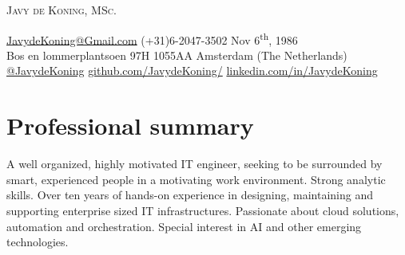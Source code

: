 \begin{center}

\fontsize{24}{24}\selectfont\scshape
Javy de Koning, MSc.\\

\fontsize{10}{10}\selectfont\scshape

{\color{companycolor}\faEnvelopeR} \url{JavydeKoning@Gmail.com}
{\large\textperiodcentered} 
{\color{companycolor}\faPhone} (+31)6-2047-3502
{\large\textperiodcentered}
{\color{companycolor}\faAlternateCalendarR} Nov 6\textsuperscript{th}, 1986\\

{\color{companycolor}\faMapR} Bos en lommerplantsoen 97H 
{\large\textperiodcentered} 1055AA 
{\large\textperiodcentered} Amsterdam (The Netherlands) \\

{\color{companycolor}\faTwitter} \href{https://twitter.com/javydekoning}{@JavydeKoning} 
{\large\textperiodcentered} 
{\color{companycolor}\faAlternateGitHub} \url{github.com/JavydeKoning/} 
{\large\textperiodcentered} 
{\color{companycolor}\faLinkedIn} \url{linkedin.com/in/JavydeKoning}

\end{center}

\section{{\textcolor{companycolor}{\faUserS}}\hspace{0.1cm}Professional summary}
A well organized, highly motivated IT engineer, seeking to be surrounded by smart, experienced people in a motivating work environment. Strong analytic skills. Over ten years of hands-on experience in designing, maintaining and supporting enterprise sized IT infrastructures. Passionate about cloud solutions, automation and orchestration. Special interest in AI and other emerging technologies.